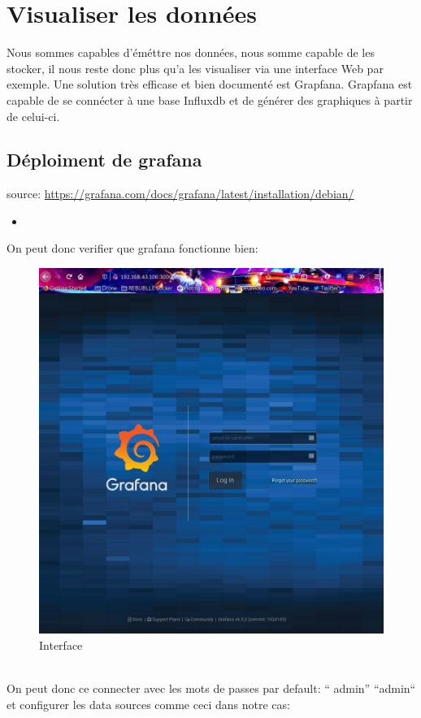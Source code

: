 \documentclass[10pt,a4paper]{article}
\newcommand{\insertcode}[2]{\begin{itemize}\item[]\end{itemize}}
\begin{document}
\section{Visualiser les données}
Nous sommes capables d'éméttre nos données, nous somme capable de les stocker, il nous reste donc plus qu'a les visualiser via une interface Web par exemple. Une solution très efficase et bien documenté est Grapfana. Grapfana est capable de se connécter à une base Influxdb et de générer des graphiques à partir de celui-ci.
\subsection{Déploiment de grafana}
source: \url{https://grafana.com/docs/grafana/latest/installation/debian/}
\insertcode{commande/grafanainstall.txt}{installation de grafana}
On peut donc verifier que grafana fonctionne bien:
  \begin{figure}[h!]
\centering
\includegraphics[scale=0.30]{screen/1.jpg}
\caption{Interface}
\label{fig:net }
\end{figure}
\\On peut donc ce connecter avec les mots de passes par default: `` admin'' ``admin`` et configurer les data sources comme ceci dans notre cas:
\end{document}
